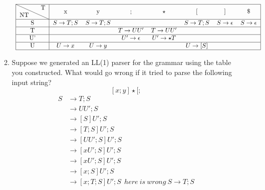 \documentclass[10pt]{article}
\begin{document}
\begin{enumerate}
\begin{enumerate}
             \[\begin{array}{cll}
                 \begin{tabular}{|c|*{7}{c}|}
                        \hline
                        \diagbox{NT}{T} & x & y & ; & $\star$ & [ & ] & \$ \\
                        \hline
                                      S & $S \rightarrow T;S$ & $S \rightarrow T;S$ &  &  & $S \rightarrow T;S$ & $S \rightarrow \epsilon $ & $S \rightarrow \epsilon $ \\
                        \hline
                                      T &  &  & $T \rightarrow UU'$ & $T \rightarrow UU'$  &  & & \\
                        \hline
                                      U' &  &  & $U' \rightarrow \epsilon $ & $U' \rightarrow \star T$ &  & & \\
                        \hline
                                      U & $U \rightarrow x$ & $U \rightarrow y$ &  &  & $U \rightarrow [S]$ & & \\
                        \hline
                  \end{tabular}
            \end{array}\]
  \item Suppose we generated an LL(1) parser for the grammar using the table you constructed. What would go wrong if it tried to parse the following input string?
  \[[x;y]\star [;\]
            \[\begin{array}{cll}
                    S & \rightarrow T;S \\
                      & \rightarrow UU';S \\
                      & \rightarrow [S]U';S \\
                      & \rightarrow [T;S]U';S \\
                      & \rightarrow [UU';S]U';S \\
                      & \rightarrow [xU';S]U';S \\
                      & \rightarrow [xU';S]U';S \\
                      & \rightarrow [x;S]U';S \\
                      & \rightarrow [x;T;S]U';S \  \ here \ is \ wrong \ S \rightarrow T;S \\

            \end{array}\] 
\end{enumerate}


\end{enumerate}
\end{document}
